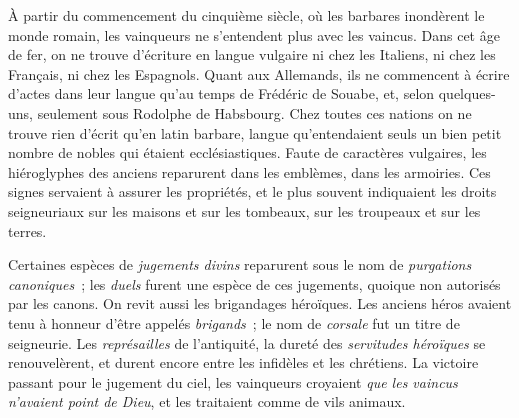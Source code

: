 \documentclass[french,twoside]{book} %
\begin{document}
À partir du commencement du cinquième siècle, où les barbares inondèrent le monde romain, les vainqueurs ne s’entendent plus avec les vaincus. Dans cet âge de fer, on ne trouve d’écriture en langue vulgaire ni chez les Italiens, ni chez les Français, ni chez les Espagnols. Quant aux Allemands, ils ne commencent à écrire d’actes dans leur langue qu’au temps de Frédéric de Souabe, et, selon quelques-uns, seulement sous Rodolphe de Habsbourg. Chez toutes ces nations on ne trouve rien d’écrit qu’en latin barbare, langue qu’entendaient seuls un bien petit nombre de nobles qui étaient ecclésiastiques. Faute de caractères vulgaires, les hiéroglyphes des anciens reparurent dans les emblèmes, dans les armoiries. Ces signes servaient à assurer les propriétés, et le plus souvent indiquaient les droits seigneuriaux sur les maisons et sur les tombeaux, sur les troupeaux et sur les terres.\par
Certaines espèces de {\itshape jugements divins} reparurent sous le nom de {\itshape purgations canoniques} ; les {\itshape duels} furent une espèce de ces jugements, quoique non autorisés par les canons. On revit aussi les brigandages héroïques. Les anciens héros avaient tenu à honneur d’être appelés {\itshape brigands} ; le nom de {\itshape corsale} fut un titre de seigneurie. Les {\itshape représailles} de l’antiquité, la dureté des {\itshape servitudes héroïques} se  renouvelèrent, et durent encore entre les infidèles et les chrétiens. La victoire passant pour le jugement du ciel, les vainqueurs croyaient {\itshape que les vaincus n’avaient point de Dieu}, et les traitaient comme de vils animaux.\par
\end{document}
